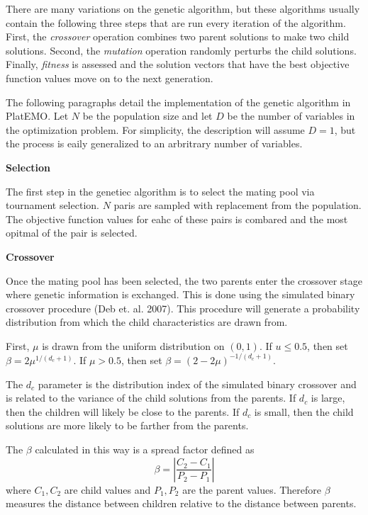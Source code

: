 \documentclass[11pt,a4paper]{article}
\begin{document}
There are many variations on the genetic algorithm, but these algorithms usually contain the following three steps that are run every iteration of the algorithm. First, the \textit{crossover} operation combines two parent solutions to make two child solutions. Second, the \textit{mutation} operation randomly perturbs the child solutions. Finally, \textit{fitness} is assessed and the solution vectors that have the best objective function values move on to the next generation.

The following paragraphs detail the implementation of the genetic algorithm in PlatEMO. Let $N$ be the population size and let $D$ be the number of variables in the optimization problem. For simplicity, the description will assume $D=1$, but the process is eaily generalized to an arbritrary number of variables.

\begin{flushleft}
\textbf{Selection}
\end{flushleft}
The first step in the genetiec algorithm is to select the mating pool via tournament selection. $N$ paris are sampled with replacement from the population. The objective function values for eahc of these pairs is combared and the most opitmal of the pair is selected.

\begin{flushleft}
\textbf{Crossover}
\end{flushleft}
Once the mating pool has been selected, the two parents enter the crossover stage where genetic information is exchanged. This is done using the simulated binary crossover procedure (Deb et. al. 2007). This procedure will generate a probability distribution from which the child characteristics are drawn from.

First, $\mu$ is drawn from the uniform distribution on $(0,1)$. If $u \leq 0.5$, then set $\beta = 2\mu^{1/(d_c+1)}$. If $\mu > 0.5$, then set $\beta = (2-2\mu)^{-1/(d_c+1)}$. 

The $d_c$ parameter is the distribution index of the simulated binary crossover and is related to the variance of the child solutions from the parents. If $d_c$ is large, then the children will likely be close to the parents.  If $d_c$ is small, then the child solutions are more likely to be farther from the parents.

The $\beta$ calculated in this way is a spread factor defined as 
$$
\beta = \left| \frac{C_2 - C_1}{P_2 - P_1} \right|
$$
where $C_1, C_2$ are child values and $P_1, P_2$ are the parent values. Therefore $\beta$ measures the distance between children relative to the distance between parents.
\end{document}
